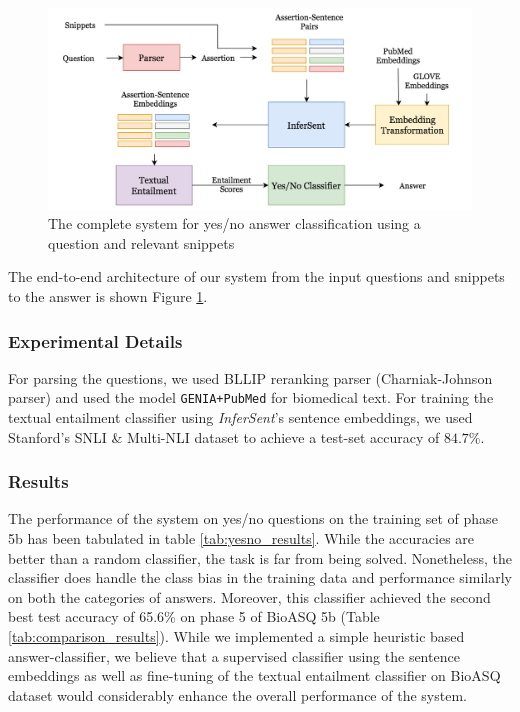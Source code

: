 \documentclass[11pt,a4paper]{article}
\begin{document}
    \begin{figure}[t!]
        \centering
        \includegraphics[scale=0.3]{images/YesNoPipeline.png}
        \caption{The complete system for yes/no answer classification using a question and relevant snippets}
        \label{fig:yesno_pipeline}
    \end{figure}

    The end-to-end architecture of our system from the input questions and snippets to the answer is shown Figure \ref{fig:yesno_pipeline}.
    
\subsubsection{Experimental Details}

For parsing the questions, we used BLLIP reranking parser \cite{charniak_new1} (Charniak-Johnson parser) %
and used the model \texttt{GENIA+PubMed} for biomedical text. For training the textual entailment classifier using \textit{InferSent}'s sentence embeddings, we used Stanford's SNLI \& Multi-NLI dataset \cite{snli} to achieve a test-set accuracy of $84.7 \%$.

\subsubsection{Results}

The performance of the system on yes/no questions on the training set of phase 5b has been tabulated in table \ref{tab:yesno_results}. While the accuracies are better than a random classifier, the task is far from being solved. Nonetheless, the classifier does handle the class bias in the training data and performance similarly on both the categories of answers. Moreover, this classifier achieved the second best test accuracy of 65.6\% on phase 5 of BioASQ 5b (Table \ref{tab:comparison_results}). While we implemented a simple heuristic based answer-classifier, we believe that a supervised classifier using the sentence embeddings as well as fine-tuning of the textual entailment classifier on BioASQ dataset would considerably enhance the overall performance of the system.
\end{document}
